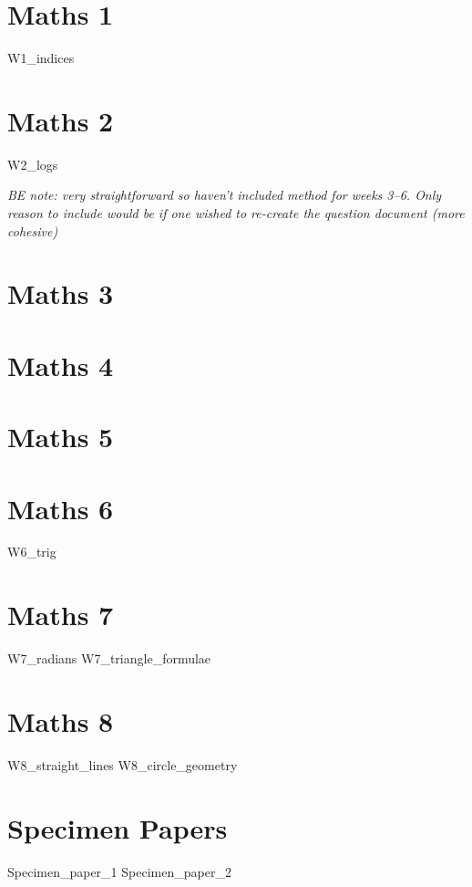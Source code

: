 \documentclass[12pt]{exam}
\begin{document}
\tableofcontents
\newpage

\section{Maths 1}
{W1_indices}

\newpage
\section{Maths 2}
{W2_logs}

\newpage
\textit{BE note: very straightforward so haven't included method for weeks 3--6.
Only reason to include would be if one wished to re-create the question 
document (more cohesive)}
\section{Maths 3}
\section{Maths 4}
\section{Maths 5}
\section{Maths 6}
{W6_trig}

\newpage
\section{Maths 7}
{W7_radians}
\newpage
{W7_triangle_formulae}

\newpage
\section{Maths 8}
{W8_straight_lines}
\newpage
{W8_circle_geometry}

\newpage
\section{Specimen Papers}
{Specimen_paper_1}
\newpage
{Specimen_paper_2}
\end{document}
